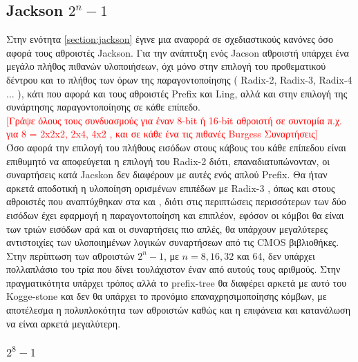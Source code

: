 \subsection{Jackson $2^n-1$}
Στην ενότητα \ref{section:jackson} έγινε μια αναφορά σε σχεδιαστικούς κανόνες όσο αφορά τους 
αθροιστές Jackson. Για την ανάπτυξη ενός Jacson αθροιστή υπάρχει ένα μεγάλο πλήθος πιθανών υλοποιήσεων,
όχι μόνο στην επιλογή του προθεματικού δέντρου και το πλήθος των όρων της παραγοντοποίησης ( Radix-2, 
Radix-3, Radix-4 ... ), κάτι που αφορά και τους αθροιστές Prefix και Ling, αλλά 
και στην επιλογή της συνάρτησης παραγοντοποίησης σε κάθε επίπεδο.
\\
\textcolor{red}{[Γράψε όλους τους συνδυασμούς για έναν 8-bit ή 16-bit αθροιστή σε συντομία
π.χ. για 8 = 2x2x2, 2x4, 4x2 , και σε κάθε ένα τις πιθανές Burgess Συναρτήσεις]}\\
Όσο αφορά την επιλογή του πλήθους εισόδων στους κάβους του κάθε επίπεδου είναι επιθυμητό να αποφεύγεται 
η επιλογή του Radix-2 διότι, επαναδιατυπώνονταν, οι συναρτήσεις κατά Jacskon δεν διαφέρουν 
με αυτές ενός απλού Prefix. Θα ήταν αρκετά αποδοτική η υλοποίηση ορισμένων επιπέδων με Radix-3
, όπως και στους αθροιστές που αναπτύχθηκαν στα \cite{6189978} και \cite{6810474}, διότι
στις περιπτώσεις περισσότερων των δύο εισόδων έχει εφαρμογή η παραγοντοποίηση και επιπλέον, εφόσον 
οι κόμβοι θα είναι των τριών εισόδων αρά και οι συναρτήσεις πιο απλές, θα υπάρχουν μεγαλύτερες 
αντιστοιχίες των υλοποιημένων λογικών συναρτήσεων από τις CMOS βιβλιοθήκες. Στην περίπτωση των 
αθροιστών $2^n-1$, με $n=8, 16, 32$ και 64, δεν υπάρχει πολλαπλάσιο του τρία που δίνει τουλάχιστον έναν 
από αυτούς τους αριθμούς. Στην πραγματικότητα υπάρχει τρόπος αλλά το prefix-tree θα διαφέρει αρκετά με αυτό
του Kogge-stone και δεν θα υπάρχει το προνόμιο επαναχρησιμοποίησης κόμβων, με αποτέλεσμα η πολυπλοκότητα των
αθροιστών καθώς και η επιφάνεια και κατανάλωση να είναι αρκετά μεγαλύτερη.




\subsubsection{$2^8-1$}

%

